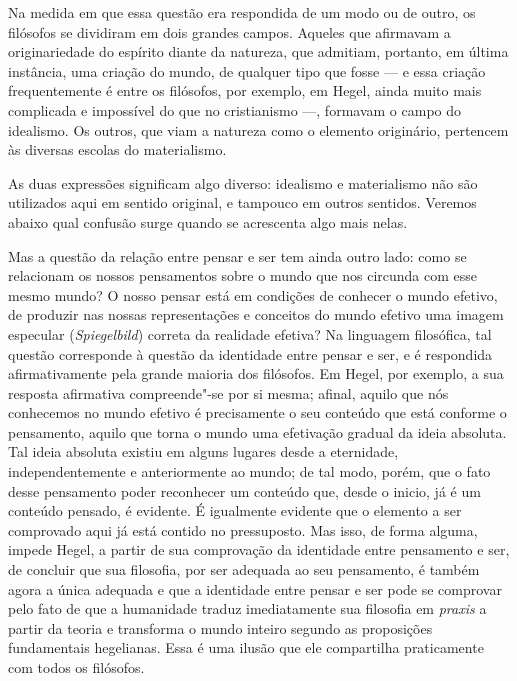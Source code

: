 Na medida em que essa questão era respondida de um modo ou de outro, os
filósofos se dividiram em dois grandes campos. Aqueles que afirmavam a
originariedade do espírito diante da natureza, que admitiam, portanto,
em última instância, uma criação do mundo, de qualquer tipo que fosse ---
e essa criação frequentemente é entre os filósofos, por exemplo,
em Hegel,
ainda muito mais complicada e impossível do que no cristianismo ---,
formavam o campo do idealismo. Os outros, que viam a natureza como o
elemento originário, pertencem às diversas escolas do materialismo.

As duas expressões significam algo diverso: idealismo e materialismo não
são utilizados aqui em sentido original, e tampouco em outros sentidos.
Veremos abaixo qual confusão surge quando se acrescenta algo mais nelas.

Mas a questão da relação entre pensar e ser tem ainda outro lado: como
se relacionam os nossos pensamentos sobre o mundo que nos circunda com
esse mesmo mundo? O nosso pensar está em condições de conhecer o mundo
efetivo, de produzir nas nossas representações e conceitos do mundo
efetivo uma imagem especular (\emph{Spiegelbild}) correta da realidade
efetiva? Na linguagem filosófica, tal questão corresponde à questão da
identidade entre pensar e ser, e é respondida afirmativamente pela
grande maioria dos filósofos.
Em Hegel,
por exemplo, a sua resposta afirmativa compreende"-se por si mesma;
afinal, aquilo que nós conhecemos no mundo efetivo é precisamente o seu
conteúdo que está conforme o pensamento, aquilo que torna o mundo uma
efetivação gradual da ideia absoluta. Tal ideia absoluta existiu em
alguns lugares desde a eternidade, independentemente e anteriormente ao
mundo; de tal modo, porém, que o fato desse pensamento poder reconhecer
um conteúdo que, desde o inicio, já é um conteúdo pensado, é evidente. É
igualmente evidente que o elemento a ser comprovado aqui já está contido
no pressuposto. Mas isso, de forma alguma, impede Hegel, a partir de sua
comprovação da identidade entre pensamento e ser, de concluir que sua
filosofia, por ser adequada ao seu pensamento, é também agora a única
adequada e que a identidade entre pensar e ser pode se comprovar pelo
fato de que a humanidade traduz imediatamente sua filosofia em
\emph{praxis} a partir da teoria e transforma o mundo inteiro segundo as
proposições fundamentais hegelianas. Essa é uma ilusão que ele
compartilha praticamente com todos os filósofos.

